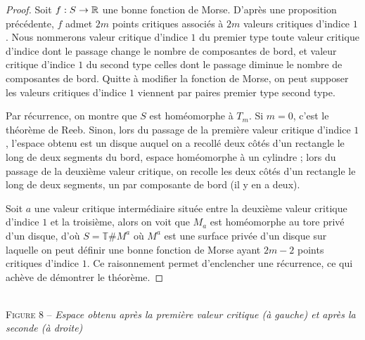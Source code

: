 \begin{proof}
    Soit $f:S\to\operatorname{\mathbb R}$ une bonne fonction de Morse. D'après une proposition précédente, $f$ admet 
    $2m$ points critiques associés à $2m$ valeurs critiques d'indice $1$. 
    Nous nommerons valeur critique d'indice $1$ du premier type toute valeur critique d'indice 
    dont le passage change le nombre de composantes de bord, et valeur critique d'indice $1$ 
    du second type celles dont le passage diminue le nombre de composantes de bord. 
    Quitte à modifier la fonction de Morse, on peut supposer les valeurs critiques d'indice 
    $1$ viennent par paires premier type second type. 

    Par récurrence, on montre que $S$ est homéomorphe à $T_m$. 
    Si $m=0$, c'est le théorème de Reeb.
    Sinon, lors du passage de la première valeur critique d'indice $1$, l'espace obtenu est un 
    disque auquel on a recollé deux côtés d'un rectangle le long de deux segments du bord, 
    espace homéomorphe à un cylindre ; lors du passage de la deuxième valeur critique, on 
    recolle les deux côtés d'un rectangle le long de deux segments, un par composante de 
    bord (il y en a deux).

    Soit $a$ une valeur critique intermédiaire située entre la deuxième valeur critique 
    d'indice $1$ et la troisième, alors on voit que $M_a$ est homéomorphe au tore privé 
    d'un disque, d'où $S=\mathbb T\#M^a$ où $M^a$ est une surface privée d'un disque 
    sur laquelle on peut définir une bonne fonction de Morse ayant $2m-2$ points critiques 
    d'indice $1$. Ce raisonnement permet d'enclencher une récurrence, ce qui achève de démontrer 
    le théorème.
\end{proof}

\begin{center}
    \\
    \textsc{Figure 8} – \textit{Espace obtenu après la première valeur critique (à gauche) et après la seconde (à droite)}
\end{center}
